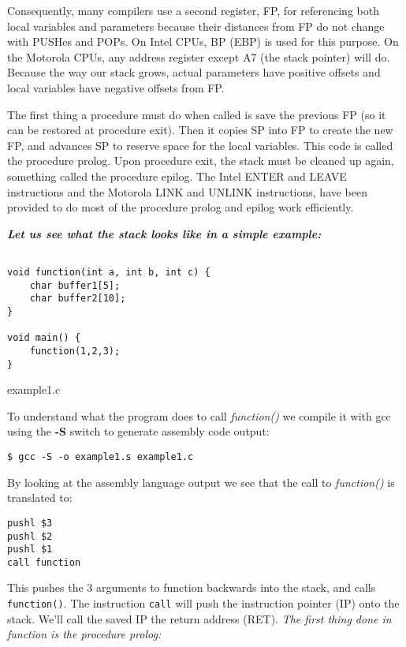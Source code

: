 \documentclass[a4paper]{article}
\begin{document}
Consequently, many compilers use a second register, FP, for referencing both local variables and parameters because their distances from FP do not change with PUSHes and POPs. On Intel CPUs, BP (EBP) is used for this purpose. On the Motorola CPUs, any address register except A7 (the stack pointer) will do. Because the way our stack grows, actual parameters have positive offsets and local variables have negative offsets from FP.

The first thing a procedure must do when called is save the previous FP (so it can be restored at procedure exit). Then it copies SP into FP to create the new FP, and advances SP to reserve space for the local variables. This code is called the procedure prolog. Upon procedure exit, the stack must be cleaned up again, something called the procedure epilog. The Intel ENTER and LEAVE instructions and the Motorola LINK and UNLINK instructions, have been provided to do most of the procedure prolog and epilog work efficiently.

\textbf{\textit{Let us see what the stack looks like in a simple example:}}

\begin{listing}[ht]
\begin{verbatim}

void function(int a, int b, int c) {
    char buffer1[5];
    char buffer2[10];
}

void main() {
    function(1,2,3);
}
\end{verbatim}
\caption{example1.c}
\label{Code:1}
\end{listing}

To understand what the program does to call \textit{function()} we compile it with gcc using the \textbf{-S} switch to generate assembly code output:


\begin{lstlisting}[style=DOS]
$ gcc -S -o example1.s example1.c
\end{lstlisting}

By looking at the assembly language output we see that the call to \textit{function()} is translated to:

\begin{verbatim}
pushl $3
pushl $2
pushl $1
call function
\end{verbatim}

This pushes the 3 arguments to function backwards into the stack, and calls \texttt{function()}. The instruction \texttt{call} will push the instruction pointer (IP) onto the stack. We’ll call the saved IP the return address (RET). \textit{The first thing done in function is the procedure prolog:}
\end{document}
